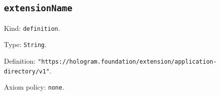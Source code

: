 \documentclass[11pt]{article}
\begin{document}
\subsection*{\texttt{extensionName}}
\noindent Kind: \texttt{definition}.\par
\noindent Type: \texttt{String}.\par
\noindent Definition: \texttt{"https://hologram.foundation/extension/application-directory/v1"}.\par
\noindent Axiom policy: \texttt{none}.\par
\end{document}
